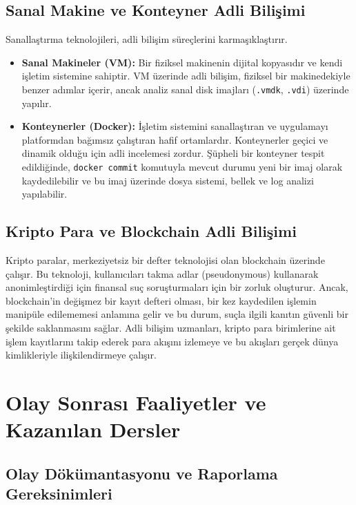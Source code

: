 \begin{itemize}
\begin{itemize}
\subsection{Sanal Makine ve Konteyner Adli Bilişimi}

Sanallaştırma teknolojileri, adli bilişim süreçlerini karmaşıklaştırır.

\begin{itemize}
    \item \textbf{Sanal Makineler (VM):} Bir fiziksel makinenin dijital kopyasıdır ve kendi işletim sistemine sahiptir. VM üzerinde adli bilişim, fiziksel bir makinedekiyle benzer adımlar içerir, ancak analiz sanal disk imajları (\texttt{.vmdk}, \texttt{.vdi}) üzerinde yapılır.
    \item \textbf{Konteynerler (Docker):} İşletim sistemini sanallaştıran ve uygulamayı platformdan bağımsız çalıştıran hafif ortamlardır. Konteynerler geçici ve dinamik olduğu için adli incelemesi zordur. Şüpheli bir konteyner tespit edildiğinde, \texttt{docker commit} komutuyla mevcut durumu yeni bir imaj olarak kaydedilebilir ve bu imaj üzerinde dosya sistemi, bellek ve log analizi yapılabilir.
\end{itemize}

\subsection{Kripto Para ve Blockchain Adli Bilişimi}

Kripto paralar, merkeziyetsiz bir defter teknolojisi olan blockchain üzerinde çalışır. Bu teknoloji, kullanıcıları takma adlar (pseudonymous) kullanarak anonimleştirdiği için finansal suç soruşturmaları için bir zorluk oluşturur. Ancak, blockchain'in değişmez bir kayıt defteri olması, bir kez kaydedilen işlemin manipüle edilememesi anlamına gelir ve bu durum, suçla ilgili kanıtın güvenli bir şekilde saklanmasını sağlar. Adli bilişim uzmanları, kripto para birimlerine ait işlem kayıtlarını takip ederek para akışını izlemeye ve bu akışları gerçek dünya kimlikleriyle ilişkilendirmeye çalışır.

\section{Olay Sonrası Faaliyetler ve Kazanılan Dersler}

\subsection{Olay Dökümantasyonu ve Raporlama Gereksinimleri}


\end{itemize}
\end{itemize}
